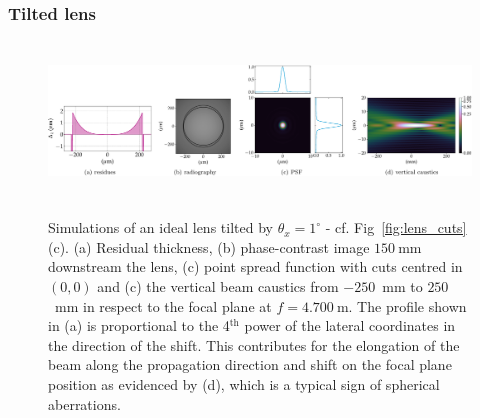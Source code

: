 \begin{refsection}
\subsubsection*{Tilted lens}
\begin{figure}[t]
        \centering
        {\includegraphics[height=4.19cm]{figures/ch04/tilted_CRL.pdf}}
        \caption[Effects of a CRL tilt]{Simulations of an ideal lens tilted by $\theta_x=1^{\circ}$ - cf. Fig~\ref{fig:lens_cuts}(c). (a) Residual thickness, (b) phase-contrast image $150~$mm downstream the lens, (c) point spread function with cuts centred in $(0,0)$ and (c) the vertical beam caustics from $-250$~mm to $250$~mm in respect to the focal plane at $f=4.700~$m. The profile shown in (a) is proportional to the 4$^{\text{th}}$ power of the lateral coordinates in the direction of the shift. This contributes for the elongation of the beam along the propagation direction and shift on the focal plane position as evidenced by (d), which is a typical sign of spherical aberrations.} \label{fig:tilted_CRL}
\end{figure}


\end{refsection}
